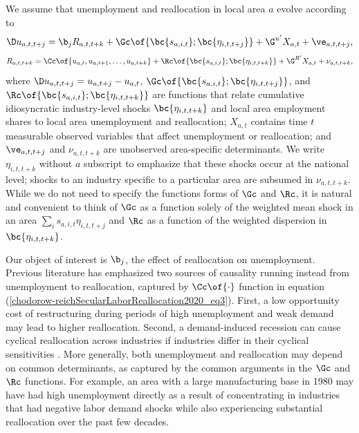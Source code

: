\documentclass[12pt]{article}
\theoremstyle{definition}
\begin{document}
We assume that unemployment and reallocation in local area $a$ evolve according to 
\begin{equation}
    \label{chodorow-reichSecularLaborReallocation2020_eq2}
    \D u_{a, t, t+j} = \b_j R_{a, t, t+k} + \Gc\of{\bc{s_{a, i, t}}; \bc{\eta_{i, t, t+j}}} + \G^{u^{\prime}} X_{a, t} + \ve_{a, t, t+j},
\end{equation}
\begin{equation}
    \label{chodorow-reichSecularLaborReallocation2020_eq3}
    R_{a, t, t+k} = \Cc\of{u_{a,t}, u_{a, t+1}, \ldots, u_{a, t+k}} + \Rc\of{\bc{s_{a, i, t}}; \bc{\eta_{i, t, t+k}}} + \G^{R^{\prime}} X_{a, t} + \nu_{a, t, t+k},
\end{equation}
where $\D u_{a, t, t+j} = u_{a, t+j} - u_{a, t}$, $\Gc\of{\bc{s_{a, i, t}}; \bc{\eta_{i, t, t+j}}}$, and $\Rc\of{\bc{s_{a, i, t}}; \bc{\eta_{i, t, t+k}}}$ are functions that relate cumulative idiosyncratic industry-level shocks $\bc{\eta_{i, t, t+k}}$ and local area employment shares to local area unemployment and reallocation; $X_{a,t}$ contains time $t$ measurable observed variables that affect unemployment or reallocation; and $\ve_{a, t, t+j}$ and $\nu_{a, t, t+k}$ are unobserved area-specific determinants. We write $\eta_{i, t, t+k}$ without $a$ subscript to emphasize that these shocks occur at the national level; shocks to an industry specific to a particular area are subsumed in $\nu_{a, t, t+k}$. While we do not need to specify the functions forms of $\Gc$ and $\Rc$, it is natural and convenient to think of $\Gc$ as a function solely of the weighted mean shock in an area $\sum_{i} s_{a, i, t} \eta_{i, t, t+j}$ and $\Rc$ as a function of the weighted dispersion in $\bc{\eta_{i, t, t+k}}$.

Our object of interest is $\b_j$, the effect of reallocation on unemployment. Previous literature has emphasized two sources of causality running instead from unemployment to reallocation, captured by $\Cc\of{\cdot}$ function in equation (\ref{chodorow-reichSecularLaborReallocation2020_eq3}). First, a low opportunity cost of restructuring during periods of high unemployment and weak demand may lead to higher reallocation. Second, a demand-induced recession can cause cyclical reallocation across industries if industries differ in their cyclical sensitivities \citep{abrahamCyclicalUnemploymentSectoral1986}. More generally, both unemployment and reallocation may depend on common determinants, as captured by the common arguments in the $\Gc$ and $\Rc$ functions. For example, an area with a large manufacturing base in 1980 may have had high unemployment directly as a result of concentrating in industries that had negative labor demand shocks while also experiencing substantial reallocation over the past few decades.
\end{document}
